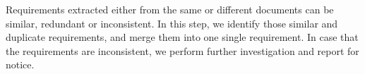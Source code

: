 
 \label{subsec:req-refinement}

Requirements extracted either from the same or different documents can be similar, redundant or inconsistent. In this step, we identify those similar and duplicate requirements, and merge them into one single requirement. In case that the requirements are inconsistent, we perform further investigation and report for notice.

